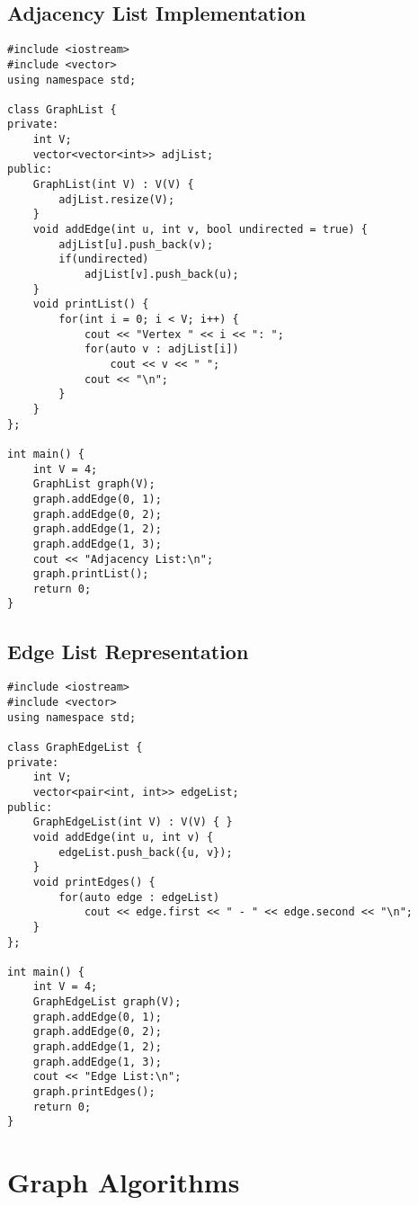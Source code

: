 \subsection{Adjacency List Implementation}
\begin{lstlisting}[caption={C++ implementation using an Adjacency List}]
#include <iostream>
#include <vector>
using namespace std;

class GraphList {
private:
    int V;
    vector<vector<int>> adjList;
public:
    GraphList(int V) : V(V) {
        adjList.resize(V);
    }
    void addEdge(int u, int v, bool undirected = true) {
        adjList[u].push_back(v);
        if(undirected)
            adjList[v].push_back(u);
    }
    void printList() {
        for(int i = 0; i < V; i++) {
            cout << "Vertex " << i << ": ";
            for(auto v : adjList[i])
                cout << v << " ";
            cout << "\n";
        }
    }
};

int main() {
    int V = 4;
    GraphList graph(V);
    graph.addEdge(0, 1);
    graph.addEdge(0, 2);
    graph.addEdge(1, 2);
    graph.addEdge(1, 3);
    cout << "Adjacency List:\n";
    graph.printList();
    return 0;
}
\end{lstlisting}

\subsection{Edge List Representation}
\begin{lstlisting}[caption={C++ implementation using an Edge List}]
#include <iostream>
#include <vector>
using namespace std;

class GraphEdgeList {
private:
    int V;
    vector<pair<int, int>> edgeList;
public:
    GraphEdgeList(int V) : V(V) { }
    void addEdge(int u, int v) {
        edgeList.push_back({u, v});
    }
    void printEdges() {
        for(auto edge : edgeList)
            cout << edge.first << " - " << edge.second << "\n";
    }
};

int main() {
    int V = 4;
    GraphEdgeList graph(V);
    graph.addEdge(0, 1);
    graph.addEdge(0, 2);
    graph.addEdge(1, 2);
    graph.addEdge(1, 3);
    cout << "Edge List:\n";
    graph.printEdges();
    return 0;
}
\end{lstlisting}

\section{Graph Algorithms}

